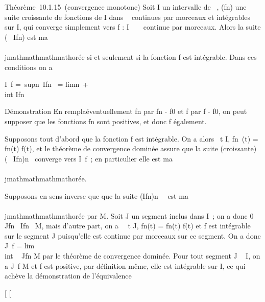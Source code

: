 Théorème~10.1.15~(convergence monotone) Soit I un intervalle de ~,
(fn) une suite croissante de fonctions de I dans ~ continues
par morceaux et intégrables sur I, qui converge simplement vers f : I \rightarrow~
~ continue par morceaux. Alors la suite (\int ~
Ifn) est ma\\\\jmathmathmathmathorée si et seulement si la fonction f est
intégrable. Dans ces conditions on a

\int  I~f =\
supn\in{}~\int  Ifn~
= limn\rightarrow~+\infty~~\\int
 Ifn

Démonstration En rempla\ccant éventuellement
fn par fn - f0 et f par f - f0,
on peut supposer que les fonctions fn sont positives, et donc
f également.

Supposons tout d'abord que la fonction f est intégrable. On a alors
\forall~t \in I, \textbar{}fn~(t)\textbar{} =
fn(t) \leq f(t), et le théorème de convergence dominée assure que
la suite (croissante) (\int ~
Ifn)n\in{}~ converge vers
\int  I~f~; en particulier elle est
ma\\\\jmathmathmathmathorée.

Supposons en sens inverse que que la suite
(\int  Ifn)n\in{}~~ est
ma\\\\jmathmathmathmathorée par M. Soit J un segment inclus dans I~; on a donc 0
\leq\int  Jfn~
\leq\int  Ifn~ \leq M, mais d'autre
part, on a \forall~~t \in J,
\textbar{}fn(t)\textbar{} = fn(t) \leq f(t) et f est
intégrable sur le segment J puisqu'elle est continue par morceaux sur ce
segment. On a donc \int  J~f
= lim\\int ~
Jfn \leq M par le théorème de convergence dominée. Pour
tout segment J \subset~ I, on a \int  J~f \leq M
et f est positive, par définition même, elle est intégrable sur I, ce
qui achève la démonstration de l'équivalence

{[}
{[}
